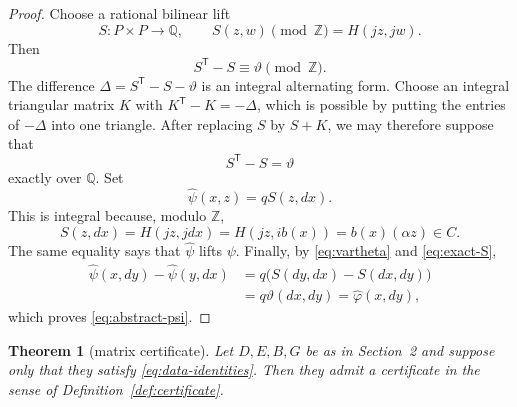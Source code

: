 \documentclass[11pt]{amsart}
\newtheorem{theorem}{Theorem}[section]
\theoremstyle{definition}
\theoremstyle{remark}
\newcommand{\Z}{\mathbb Z}
\newcommand{\Q}{\mathbb Q}
\begin{document}
\begin{proof}
Choose a rational bilinear lift
\[
 S:P\times P\to\Q,\qquad
 S(z,w)\pmod{\Z}=H(jz,jw).
\]
Then
\[
                       S^{\mathsf T}-S\equiv\vartheta\pmod\Z.
\]
The difference \(\Delta=S^{\mathsf T}-S-\vartheta\) is an integral
alternating form.  Choose an integral triangular matrix \(K\) with
\(K^{\mathsf T}-K=-\Delta\), which is possible by putting the entries
of \(-\Delta\) into one triangle.  After replacing \(S\) by \(S+K\),
we may therefore suppose that
\begin{equation}\label{eq:exact-S}
                           S^{\mathsf T}-S=\vartheta
\end{equation}
exactly over \(\Q\).  Set
\[
                         \widehat\psi(x,z)=qS(z,dx).
\]
This is integral because, modulo \(\Z\),
\[
 S(z,dx)=H(jz,jdx)=H(jz,ib(x))=b(x)(\alpha z)\in C.
\]
The same equality says that \(\widehat\psi\) lifts \(\psi\).  Finally,
by \eqref{eq:vartheta} and \eqref{eq:exact-S},
\[
\begin{aligned}
 \widehat\psi(x,dy)-\widehat\psi(y,dx)
 &=q\bigl(S(dy,dx)-S(dx,dy)\bigr)\\
 &=q\vartheta(dx,dy)
  =\widehat\varphi(x,dy),
\end{aligned}
\]
which proves \eqref{eq:abstract-psi}.
\end{proof}

\begin{theorem}[matrix certificate]\label{thm:matrix}
Let \(D,E,B,G\) be as in Section~2 and suppose only that they satisfy
\eqref{eq:data-identities}.  Then they admit a certificate in the
sense of Definition~\ref{def:certificate}.
\end{theorem}
\end{document}
